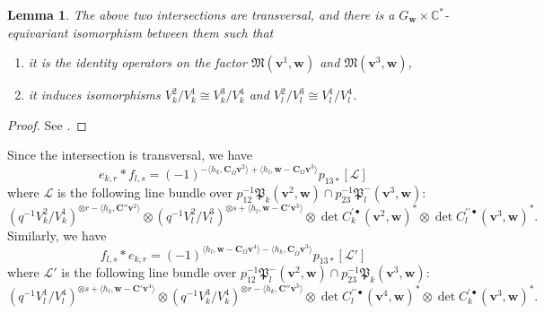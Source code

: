 \documentclass[12pt]{amsart}
\def\Bbb{\mathbb}
\def\frak{\mathfrak}
\renewcommand{\labelenumi}{(\theenumi)}%
\newenvironment{aenume}{%
  \begin{enumerate}%
  \renewcommand{\theenumi}{\alph{enumi}}%
  \renewcommand{\labelenumi}{(\theenumi)}%
  }{\end{enumerate}}
\newtheorem{Lemma}[equation]{Lemma}
\theoremstyle{definition}
\theoremstyle{remark}
\numberwithin{equation}{subsection}
\newcommand{\C}{{\Bbb C}}
\newcommand{\M}{{\frak M}} %
\newcommand{\bv}{{\mathbf v}} %
\newcommand{\bw}{{\mathbf w}} %
\newcommand{\bC}{{\mathbf C}} %
\newcommand{\Pa}{{\frak P}} %
\begin{document}
\begin{Lemma}\label{lem:EFint}
The above two intersections are transversal,
and there is a $G_\bw\times\C^*$-equivariant isomorphism between them
such that
\begin{aenume}
\item it is the identity operators on the factor
$\M(\bv^1,\bw)$ and $\M(\bv^3,\bw)$,
\item it induces isomorphisms $V^2_k/V^1_k\cong V^3_k/V^4_k$ and
$V^2_l/V^3_l\cong V^1_l/V^4_l$.
\end{aenume}
\end{Lemma}

\begin{proof}
See \cite[Lemmas~9.8, 9.9, 9.10 and their proofs]{Na-alg}.
\end{proof}

Since the intersection is transversal, we have
\begin{equation}\label{eq:EF}
  e_{k,r} * f_{l,s} 
  = (-1)^{-\langle h_k, \bC_{\overline\Omega}\bv^2\rangle
          +\langle h_l, \bw-\bC_\Omega\bv^3\rangle}
  p_{13*}[\mathcal L]
\end{equation}
where $\mathcal L$ is the following line bundle over
$p_{12}^{-1}\Pa_k(\bv^2,\bw) \cap p_{23}^{-1}\Pa^-_{l}(\bv^3,\bw)$:
\begin{equation*}
  \left(q^{-1}V_k^2/V^1_k\right)^{\otimes r-\langle h_k, \bC''\bv^2\rangle}
  \otimes
  \left(q^{-1}V_l^2/V^3_l\right)^{\otimes s+\langle h_l, \bw-\bC'\bv^3\rangle}
  \otimes \det C_k^{\prime\bullet}(\bv^2,\bw)^*
  \otimes \det C_l^{\prime\prime\bullet}(\bv^3,\bw)^*.
\end{equation*}
Similarly, we have
\begin{equation}\label{eq:FE}
  f_{l,s} * e_{k,r} 
  = (-1)^{\langle h_l, \bw-\bC_\Omega\bv^4\rangle
         -\langle h_k, \bC_{\overline\Omega}\bv^3\rangle}
  p_{13*}[\mathcal L']
\end{equation}
where $\mathcal L'$ is the following line bundle over
$p_{12}^{-1}\Pa^-_{l}(\bv^2,\bw) \cap p_{23}^{-1}\Pa_{k}(\bv^3,\bw)$:
\begin{equation*}
  \left(q^{-1}V_l^1/V^4_l\right)^{\otimes s+\langle h_l, \bw-\bC'\bv^4\rangle}
  \otimes
  \left(q^{-1}V_k^3/V^4_k\right)^{\otimes r-\langle h_k, \bC''\bv^3\rangle}
  \otimes \det C_l^{\prime\prime\bullet}(\bv^4,\bw)^*
  \otimes \det C_k^{\prime\bullet}(\bv^3,\bw)^*.
\end{equation*}
\end{document}
